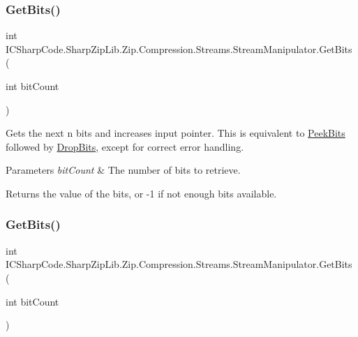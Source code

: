 \subsubsection{\texorpdfstring{Get\+Bits()}{GetBits()}\hspace{0.1cm}{\footnotesize\ttfamily [1/2]}}
{\footnotesize\ttfamily int I\+C\+Sharp\+Code.\+Sharp\+Zip\+Lib.\+Zip.\+Compression.\+Streams.\+Stream\+Manipulator.\+Get\+Bits (\begin{DoxyParamCaption}\item[{int}]{bit\+Count }\end{DoxyParamCaption})\hspace{0.3cm}{\ttfamily [inline]}}



Gets the next n bits and increases input pointer. This is equivalent to \hyperlink{class_i_c_sharp_code_1_1_sharp_zip_lib_1_1_zip_1_1_compression_1_1_streams_1_1_stream_manipulator_acffdc659e2508d7642be37f3c0fa1ec0}{Peek\+Bits} followed by \hyperlink{class_i_c_sharp_code_1_1_sharp_zip_lib_1_1_zip_1_1_compression_1_1_streams_1_1_stream_manipulator_a133a3593f65193421981087e5f32b6a3}{Drop\+Bits}, except for correct error handling. 


\begin{DoxyParams}{Parameters}
{\em bit\+Count} & The number of bits to retrieve.\\
\hline
\end{DoxyParams}
\begin{DoxyReturn}{Returns}
the value of the bits, or -\/1 if not enough bits available. 
\end{DoxyReturn}
\mbox{\label{class_i_c_sharp_code_1_1_sharp_zip_lib_1_1_zip_1_1_compression_1_1_streams_1_1_stream_manipulator_a2e01ba3e4c4dc842b4f230e04d45f415}} 
\subsubsection{\texorpdfstring{Get\+Bits()}{GetBits()}\hspace{0.1cm}{\footnotesize\ttfamily [2/2]}}
{\footnotesize\ttfamily int I\+C\+Sharp\+Code.\+Sharp\+Zip\+Lib.\+Zip.\+Compression.\+Streams.\+Stream\+Manipulator.\+Get\+Bits (\begin{DoxyParamCaption}\item[{int}]{bit\+Count }\end{DoxyParamCaption})\hspace{0.3cm}{\ttfamily [inline]}}



